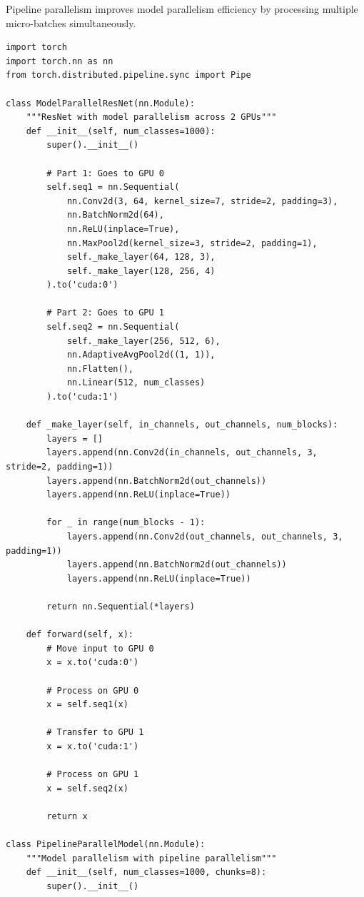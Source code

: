 Pipeline parallelism improves model parallelism efficiency by processing multiple micro-batches simultaneously.

\begin{lstlisting}[style=python, caption=Model parallelism with pipeline parallelism in PyTorch]
import torch
import torch.nn as nn
from torch.distributed.pipeline.sync import Pipe

class ModelParallelResNet(nn.Module):
    """ResNet with model parallelism across 2 GPUs"""
    def __init__(self, num_classes=1000):
        super().__init__()

        # Part 1: Goes to GPU 0
        self.seq1 = nn.Sequential(
            nn.Conv2d(3, 64, kernel_size=7, stride=2, padding=3),
            nn.BatchNorm2d(64),
            nn.ReLU(inplace=True),
            nn.MaxPool2d(kernel_size=3, stride=2, padding=1),
            self._make_layer(64, 128, 3),
            self._make_layer(128, 256, 4)
        ).to('cuda:0')

        # Part 2: Goes to GPU 1
        self.seq2 = nn.Sequential(
            self._make_layer(256, 512, 6),
            nn.AdaptiveAvgPool2d((1, 1)),
            nn.Flatten(),
            nn.Linear(512, num_classes)
        ).to('cuda:1')

    def _make_layer(self, in_channels, out_channels, num_blocks):
        layers = []
        layers.append(nn.Conv2d(in_channels, out_channels, 3, stride=2, padding=1))
        layers.append(nn.BatchNorm2d(out_channels))
        layers.append(nn.ReLU(inplace=True))

        for _ in range(num_blocks - 1):
            layers.append(nn.Conv2d(out_channels, out_channels, 3, padding=1))
            layers.append(nn.BatchNorm2d(out_channels))
            layers.append(nn.ReLU(inplace=True))

        return nn.Sequential(*layers)

    def forward(self, x):
        # Move input to GPU 0
        x = x.to('cuda:0')

        # Process on GPU 0
        x = self.seq1(x)

        # Transfer to GPU 1
        x = x.to('cuda:1')

        # Process on GPU 1
        x = self.seq2(x)

        return x

class PipelineParallelModel(nn.Module):
    """Model parallelism with pipeline parallelism"""
    def __init__(self, num_classes=1000, chunks=8):
        super().__init__()


\end{lstlisting}

